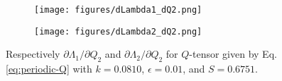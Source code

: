 \documentclass[reqno]{article}
\begin{document}
\begin{figure}[h] 
  \centering
  \begin{subfigure}{0.45\textwidth}
    \texttt{[image: figures/dLambda1\_dQ2.png]}
    \caption{}
    \label{fig:dLambda1_dQ2}
  \end{subfigure}
  \hfill
  \begin{subfigure}{0.45\textwidth}
    \texttt{[image: figures/dLambda2\_dQ2.png]}
    \caption{}
    \label{fig:dLambda2_dQ2}
  \end{subfigure}
  \caption{Respectively $\partial \Lambda_1 / \partial Q_2$ and $\partial
    \Lambda_2 / \partial Q_2$ for $Q$-tensor given by Eq. \eqref{eq:periodic-Q}
    with $k = 0.0810$, $\epsilon = 0.01$, and $S = 0.6751$.}
  \label{fig:dLambda_dx}
\end{figure}
\end{document}
